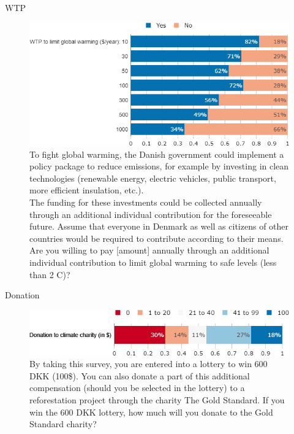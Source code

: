 \documentclass[aspectratio=169,9pt,dvipsnames]{beamer}
\begin{document}
\begin{frame}{WTP}%
\begin{figure}[h!]
\centering
\caption{To fight global warming, the Danish government could implement a policy package to reduce emissions, for example by investing in clean technologies (renewable energy, electric vehicles, public transport, more efficient insulation, etc.). \\
The funding for these investments could be collected annually through an additional individual contribution for the foreseeable future. Assume that everyone in Denmark as well as citizens of other countries would be required to contribute according to their means. \\ Are you willing to pay [amount] annually through an additional individual contribution to limit global warming to safe levels (less than 2 \degree{}C)?}
\includegraphics[width=.7\textwidth]{../figures/DK/wtp_DK.png} %
\end{figure}
\end{frame}

\begin{frame}{Donation}
\begin{figure}[h!]
\centering
\caption{By taking this survey, you are entered into a lottery to win 600 DKK (100\$). You can also donate a part of this additional compensation (should you be selected in the lottery) to a reforestation project through the charity The Gold Standard. If you win the 600 DKK lottery, how much will you donate to the Gold Standard charity?}
\includegraphics[width=.9\textwidth]{../figures/DK/donation_agg_DK.png}
\end{figure}
\end{frame}
\end{document}
